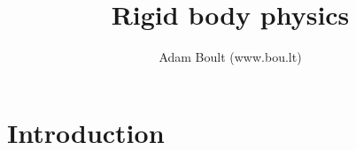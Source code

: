\documentclass[oneside]{book}
\begin{document}
\author{Adam Boult (www.bou.lt)}
\title{Rigid body physics}
\maketitle

\setcounter{tocdepth}{0}
\tableofcontents



\part{Introduction}




\end{document}
